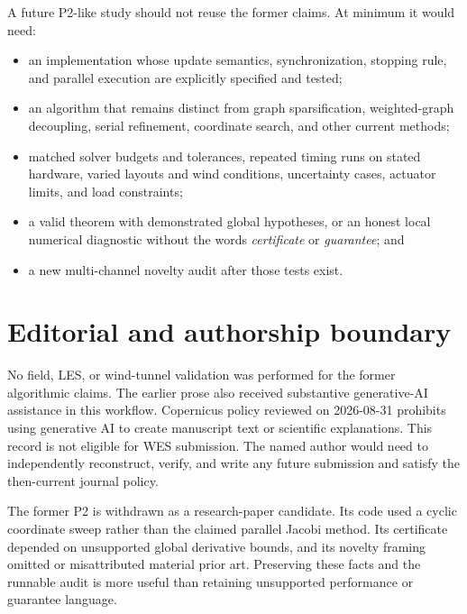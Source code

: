 \documentclass[wes, manuscript]{copernicus}
\begin{document}
A future P2-like study should not reuse the former claims. At minimum it would need:
\begin{itemize}
\item an implementation whose update semantics, synchronization, stopping rule, and parallel execution are explicitly specified and tested;
\item an algorithm that remains distinct from graph sparsification, weighted-graph decoupling, serial refinement, coordinate search, and other current methods;
\item matched solver budgets and tolerances, repeated timing runs on stated hardware, varied layouts and wind conditions, uncertainty cases, actuator limits, and load constraints;
\item a valid theorem with demonstrated global hypotheses, or an honest local numerical diagnostic without the words \emph{certificate} or \emph{guarantee}; and
\item a new multi-channel novelty audit after those tests exist.
\end{itemize}

\section{Editorial and authorship boundary}
\label{sec:editorial}

No field, LES, or wind-tunnel validation was performed for the former algorithmic claims. The earlier prose also received substantive generative-AI assistance in this workflow. Copernicus policy reviewed on 2026-08-31 prohibits using generative AI to create manuscript text or scientific explanations. This record is not eligible for WES submission. The named author would need to independently reconstruct, verify, and write any future submission and satisfy the then-current journal policy.

\conclusions
\label{sec:conclusions}

The former P2 is withdrawn as a research-paper candidate. Its code used a cyclic coordinate sweep rather than the claimed parallel Jacobi method. Its certificate depended on unsupported global derivative bounds, and its novelty framing omitted or misattributed material prior art. Preserving these facts and the runnable audit is more useful than retaining unsupported performance or guarantee language.





\end{document}
